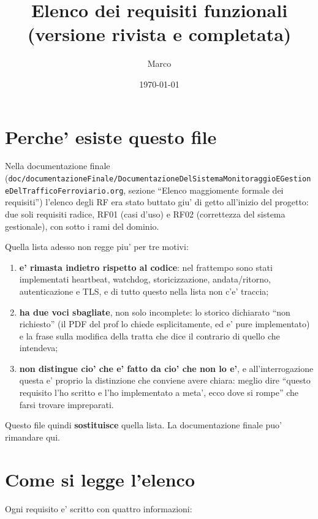 \documentclass[11pt]{article}
\author{Marco}
\date{\today}
\title{Elenco dei requisiti funzionali (versione rivista e completata)}
\begin{document}
\maketitle
\tableofcontents

\section{Perche' esiste questo file}
\label{sec:org943bd79}

Nella documentazione finale (\texttt{doc/documentazioneFinale/DocumentazioneDelSistemaMonitoraggioEGestioneDelTrafficoFerroviario.org},
sezione ``Elenco maggiomente formale dei requisiti'') l'elenco degli RF era stato buttato giu' di getto
all'inizio del progetto: due soli requisiti radice, RF01 (casi d'uso) e RF02 (correttezza del sistema
gestionale), con sotto i rami del dominio.

Quella lista adesso non regge piu' per tre motivi:

\begin{enumerate}
\item \textbf{e' rimasta indietro rispetto al codice}: nel frattempo sono stati implementati heartbeat,
watchdog, storicizzazione, andata/ritorno, autenticazione e TLS, e di tutto questo nella lista
non c'e' traccia;
\item \textbf{ha due voci sbagliate}, non solo incomplete: lo storico dichiarato ``non richiesto'' (il PDF del
prof lo chiede esplicitamente, ed e' pure implementato) e la frase sulla modifica della tratta
che dice il contrario di quello che intendeva;
\item \textbf{non distingue cio' che e' fatto da cio' che non lo e'}, e all'interrogazione questa e' proprio
la distinzione che conviene avere chiara: meglio dire ``questo requisito l'ho scritto e l'ho
implementato a meta', ecco dove si rompe'' che farsi trovare impreparati.
\end{enumerate}

Questo file quindi \textbf{sostituisce} quella lista. La documentazione finale puo' rimandare qui.
\section{Come si legge l'elenco}
\label{sec:org5c739bb}

Ogni requisito e' scritto con quattro informazioni:
\end{document}
